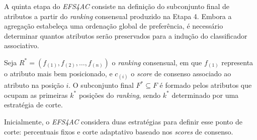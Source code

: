 A quinta etapa do \textit{EFS4AC} consiste na definição do subconjunto final de atributos a partir do \textit{ranking} consensual produzido na Etapa 4. Embora a agregação estabeleça uma ordenação global de preferência, é necessário determinar quantos atributos serão preservados para a indução do classificador associativo.

Seja $R^{*}=(f_{(1)},f_{(2)},\ldots,f_{(n)})$ o \textit{ranking} consensual, em que $f_{(1)}$ representa o atributo mais bem posicionado, e $c_{(i)}$ o \textit{score} de consenso associado ao atributo na posição $i$. O subconjunto final $F^{*}\subseteq F$ é formado pelos atributos que ocupam as primeiras $k^{*}$ posições do \textit{ranking}, sendo $k^{*}$ determinado por uma estratégia de corte.

Inicialmente, o \textit{EFS4AC} considera duas estratégias para definir esse ponto de corte: percentuais fixos e corte adaptativo baseado nos \textit{scores} de consenso.

